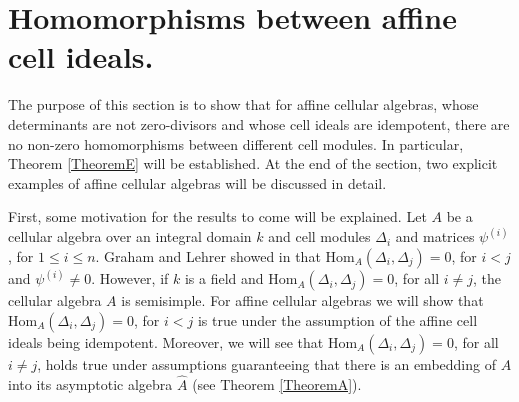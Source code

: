 \documentclass[oneside, a4paper, 11pt]{amsart}
\newcommand{\Hom}{\mathrm{Hom}}
\begin{document}
\section{Homomorphisms between affine cell ideals.}
The purpose of this section is to show that for affine cellular algebras, whose determinants are not zero-divisors and whose cell ideals are idempotent, there are no non-zero homomorphisms between different cell modules. In particular,
Theorem \ref{TheoremE} will be established. At the end of the section, two
explicit examples of affine cellular algebras will be discussed in detail.

First, some motivation for the results to come will be explained. Let $A$ be  a cellular algebra  over an integral domain $k$ and cell modules $\Delta_i$ and matrices $\psi^{(i)}$, for $1\leq i \leq n$.  Graham and Lehrer showed in \cite[Proposition 2.6]{GrahamLehrer} that $\Hom_A(\Delta_i, \Delta_j)=0$, for $i<j$ and $\psi^{(i)}\neq 0$. However, if $k$ is a field and $\Hom_A(\Delta_i, \Delta_j)
=0$, for all $i \neq j$, the cellular algebra $A$ is semisimple. For affine
cellular algebras we will show that $\Hom_A(\Delta_i, \Delta_j)=0$, for $i<j$
is true under the assumption of the affine cell ideals being idempotent.
Moreover, we will see that
$\Hom_A(\Delta_i, \Delta_j)=0$, for all $i \neq j$, holds true under
assumptions guaranteeing that there is an embedding of $A$ into its
asymptotic algebra $\hat{A}$ (see Theorem \ref{TheoremA}).
\end{document}
